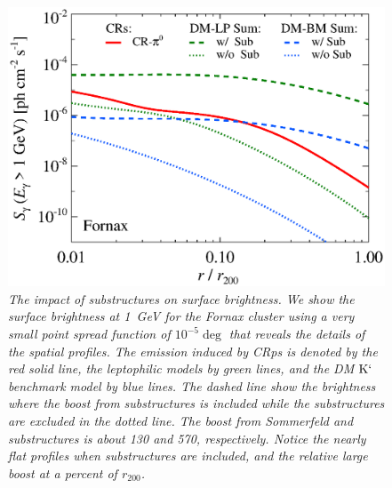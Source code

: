 \documentclass[10pt,aps,pra,reprint,amsmath,amsfonts,amssymb,showpacs]{revtex4-1}
\newcommand{\rmn}{\mathrm}
\newcommand{\Kp}{\rmn{K}`}
\newcommand{\rvir}{r_{200}}
\begin{document}
\begin{figure}%
 \includegraphics[width=0.99\columnwidth]{figures/SB.resolved.v9.1GeV.SF300.noSuB.vs.SubMass.elmu.eps}
\caption{\it The impact of substructures on surface brightness. We
  show the surface brightness at 1~GeV for the Fornax cluster using a
  very small point spread function of $10^{-5}\deg$ that reveals the
  details of the spatial profiles. The emission induced by CRps is
  denoted by the red solid line, the leptophilic models by green
  lines, and the DM $\Kp$ benchmark model by blue lines. The dashed
  line show the brightness where the boost from substructures is
  included while the substructures are excluded in the dotted
  line. The boost from Sommerfeld and substructures is about 130 and
  570, respectively. Notice the nearly flat profiles when
  substructures are included, and the relative large boost at a
  percent of $\rvir$.}
 \label{fig:SB_sub}
\end{figure}
\end{document}

